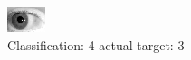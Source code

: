 \begin{figure}[h!]
\begin{center}
\includegraphics[width=0.60\columnwidth]{figures/ID289_class_4_target_3.png}
\end{center}
\caption{ Classification: 4 actual target: 3}
\label{fig:ID289_class_4_target_3}
\end{figure}
